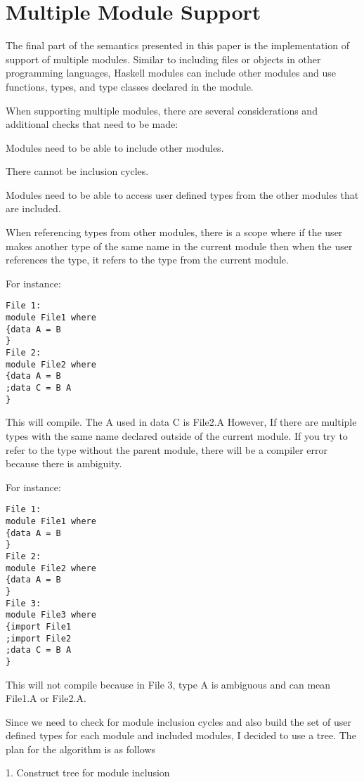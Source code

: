 \chapter{Multiple Module Support}
The final part of the semantics presented in this paper is the implementation of support of multiple modules. Similar to including files or objects in other programming languages, Haskell modules can include other modules and use functions, types, and type classes declared in the module.

When supporting multiple modules, there are several considerations and additional checks that need to be made:

Modules need to be able to include other modules.

There cannot be inclusion cycles.

Modules need to be able to access user defined types from the other modules that are included.

When referencing types from other modules, there is a scope where if the user makes another type of the same name in the current module then when the user references the type, it refers to the type from the current module.

For instance:
\begin{lstlisting}
File 1:
module File1 where
{data A = B
}
File 2:
module File2 where
{data A = B
;data C = B A
}
\end{lstlisting}

This will compile. The A used in data C is File2.A
However, If there are multiple types with the same name declared outside of the current module. If you try to refer to the type without the parent module, there will be a compiler error because there is ambiguity.

For instance:

\begin{lstlisting}
File 1:
module File1 where
{data A = B
}
File 2:
module File2 where
{data A = B
}
File 3:
module File3 where
{import File1
;import File2
;data C = B A
}
\end{lstlisting}

This will not compile because in File 3, type A is ambiguous and can mean File1.A or File2.A.

Since we need to check for module inclusion cycles and also build the set of user defined types for each module and included modules, I decided to use a tree.
The plan for the algorithm is as follows

1. Construct tree for module inclusion


